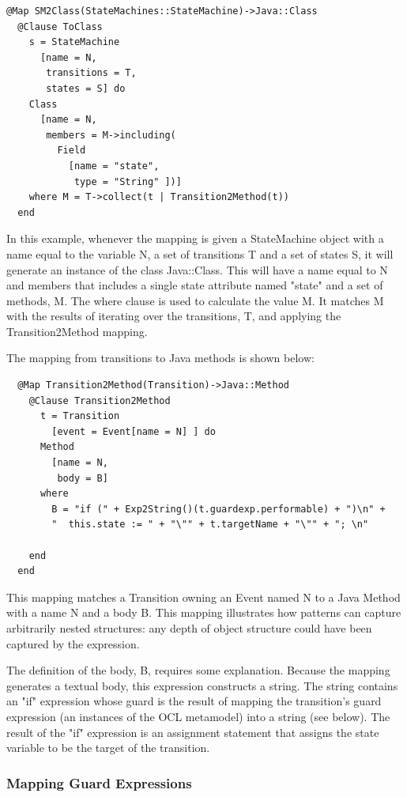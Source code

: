 \begin{lstlisting}
@Map SM2Class(StateMachines::StateMachine)->Java::Class
  @Clause ToClass
    s = StateMachine
      [name = N,
       transitions = T,
       states = S] do
    Class
      [name = N,
       members = M->including(
         Field
           [name = "state",
            type = "String" ])]
    where M = T->collect(t | Transition2Method(t))
  end
\end{lstlisting}
In this example, whenever the mapping is given a StateMachine
object with a name equal to the variable N, a set of transitions T
and a set of states S, it will generate an instance of the class
Java::Class. This will have a name equal to N and members that
includes a single state attribute named "state" and a set of
methods, M. The where clause is used to calculate the value M. It
matches M with the results of iterating over the transitions, T,
and applying the Transition2Method mapping.

\noindent The mapping from transitions to Java methods is shown
below:


\begin{lstlisting}
  @Map Transition2Method(Transition)->Java::Method
    @Clause Transition2Method
      t = Transition
        [event = Event[name = N] ] do
      Method
        [name = N,
         body = B]
      where
        B = "if (" + Exp2String()(t.guardexp.performable) + ")\n" +
        "  this.state := " + "\"" + t.targetName + "\"" + "; \n"

    end
  end
\end{lstlisting}
This mapping matches a Transition owning an Event named N to a
Java Method with a name N and a body B. This mapping illustrates
how patterns can capture arbitrarily nested structures: any depth
of object structure could have been captured by the expression.

The definition of the body, B, requires some explanation. Because
the mapping generates a textual body, this expression constructs a
string. The string contains an "if" expression whose guard is the
result of mapping the transition's guard expression (an instances
of the OCL metamodel) into a string (see below). The result of the
"if" expression is an assignment statement that assigns the state
variable to be the target of the transition.

\subsubsection{Mapping Guard Expressions}


